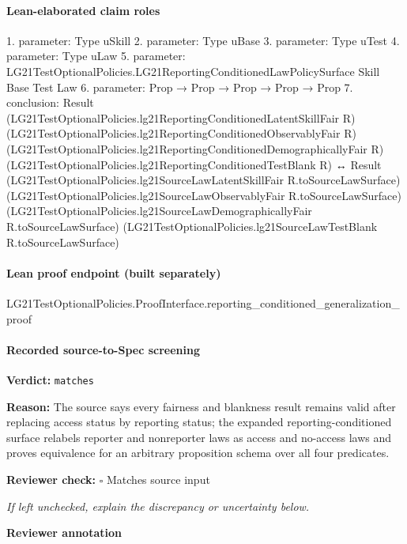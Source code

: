 \documentclass[10pt]{article}
\newcommand{\reviewerbox}{%
  \par\noindent\fbox{\parbox{0.96\linewidth}{\rule{0pt}{0.38in}}}\par
}
\newcommand{\reviewmatch}[1]{%
  \par\noindent\textbf{Reviewer check:} $\square$\; #1\par
  \noindent\emph{If left unchecked, explain the discrepancy or uncertainty below.}\par
}
\begin{document}
\paragraph{Lean-elaborated claim roles}\begin{ReviewVerbatim}
1. parameter: Type uSkill
2. parameter: Type uBase
3. parameter: Type uTest
4. parameter: Type uLaw
5. parameter: LG21TestOptionalPolicies.LG21ReportingConditionedLawPolicySurface Skill Base Test Law
6. parameter: Prop → Prop → Prop → Prop → Prop
7. conclusion: Result (LG21TestOptionalPolicies.lg21ReportingConditionedLatentSkillFair R)
    (LG21TestOptionalPolicies.lg21ReportingConditionedObservablyFair R)
    (LG21TestOptionalPolicies.lg21ReportingConditionedDemographicallyFair R)
    (LG21TestOptionalPolicies.lg21ReportingConditionedTestBlank R) ↔
  Result (LG21TestOptionalPolicies.lg21SourceLawLatentSkillFair R.toSourceLawSurface)
    (LG21TestOptionalPolicies.lg21SourceLawObservablyFair R.toSourceLawSurface)
    (LG21TestOptionalPolicies.lg21SourceLawDemographicallyFair R.toSourceLawSurface)
    (LG21TestOptionalPolicies.lg21SourceLawTestBlank R.toSourceLawSurface)
\end{ReviewVerbatim}

\paragraph{Lean proof endpoint (built separately)}\begin{ReviewVerbatim}
LG21TestOptionalPolicies.ProofInterface.reporting_conditioned_generalization_proof
\end{ReviewVerbatim}

\paragraph{Recorded source-to-Spec screening}
\textbf{Verdict:} \texttt{matches}
\\
{\raggedright
\textbf{Reason:} The source says every fairness and blankness result remains valid after replacing access status by reporting status;\allowbreak{} the expanded reporting-\allowbreak{}conditioned surface relabels reporter and nonreporter laws as access and no-\allowbreak{}access laws and proves equivalence for an arbitrary proposition schema over all four predicates.\allowbreak{}
\par}
\reviewmatch{Matches source input}
\noindent\textbf{Reviewer annotation}\par
\reviewerbox
\clearpage
\hypertarget{source-claim-c1ab3f67a9da6144}{}
\end{document}
